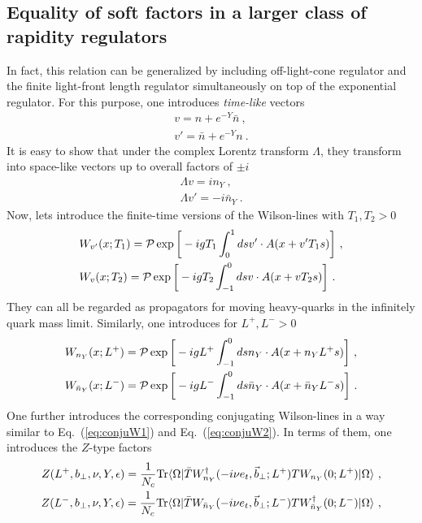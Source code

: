 \documentclass[a4paper,11pt]{article}
\begin{document}
\subsection{Equality of soft factors in a larger class of rapidity regulators}\label{sec:equality2}
In fact, this relation can be generalized by including off-light-cone regulator and the finite light-front length regulator simultaneously on top of the exponential regulator. For this purpose, one introduces {\it time-like} vectors
\begin{align}
v=n+e^{-Y}\bar n \ , \label{eq:timelikev} \\
v'=\bar n+e^{-Y} n \ .
\end{align}
It is easy to show that under the complex Lorentz transform $\Lambda$,  they transform into space-like vectors up to overall factors of $\pm i$
\begin{align}
\Lambda v=in_Y \ , \\
\Lambda v'=-i\bar n_Y \ .
\end{align}
Now, lets introduce the finite-time versions of the Wilson-lines with $T_1,T_2>0$
\begin{align}
&W_{v'}(x;T_1)={\cal P}\exp \bigg[-ig T_1\int_{0}^{1} ds v'\cdot A(x+v' T_1s)\bigg] \ , \\
&W_{v}(x;T_2)={\cal P}\exp \bigg[-ig T_2\int_{-1}^{0} ds v\cdot A(x+v T_2 s)\bigg]  \ .
\end{align}
They can all be regarded as propagators for moving heavy-quarks in the infinitely quark mass limit. Similarly, one introduces for $L^+,L^->0$
\begin{align}
&W_{n_Y}(x;L^+)={\cal P}\exp \bigg[-ig L^+\int_{-1}^{0} ds n_Y\cdot A(x+n_Y L^+s)\bigg] \ , \\
&W_{\bar n_Y}(x;L^-)={\cal P}\exp \bigg[-ig L^-\int_{-1}^{0} ds \bar n_Y\cdot A(x+\bar n_Y L^-s)\bigg] \ .
\end{align}
One further introduces the corresponding conjugating Wilson-lines in a way similar to Eq.~(\ref{eq:conjuW1}) and Eq.~(\ref{eq:conjuW2}). In terms of them, one introduces the $Z$-type factors 
\begin{align}
Z(L^+,b_\perp,\nu,Y,\epsilon)=\frac{1}{N_c}{\rm Tr}\langle \Omega|\bar{T} W_{n_Y}^{\dagger}(-i\nu e_t,\vec{b}_\perp;L^+)TW_{n_Y}(0;L^+)|\Omega\rangle \ , \\ 
Z(L^-,b_\perp,\nu,Y,\epsilon)=\frac{1}{N_c}{\rm Tr}\langle \Omega|\bar{T} W_{\bar n_Y}(-i\nu e_t,\vec{b}_\perp;L^-)TW^{\dagger}_{\bar n_Y}(0;L^-)|\Omega\rangle \ ,
\end{align}
\end{document}
